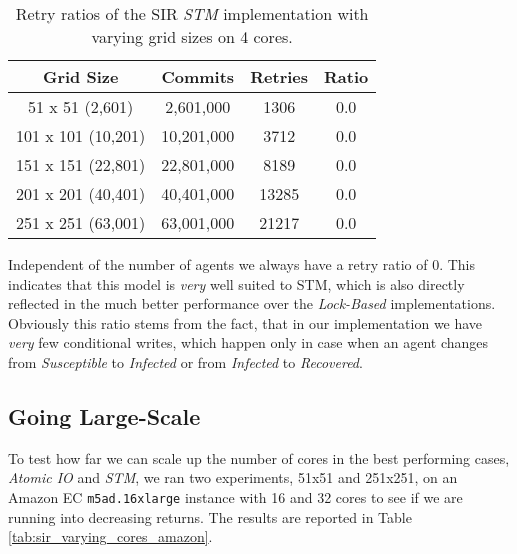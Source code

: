 \begin{table}
	\centering
  	\begin{tabular}{ c || c | c | c }
        Grid Size 		   & Commits     & Retries  & Ratio  \\ \hline \hline 
   		51 x 51 (2,601)     & 2,601,000   & 1306     & 0.0    \\ \hline
   		101 x 101 (10,201)  & 10,201,000  & 3712     & 0.0    \\ \hline
   		151 x 151 (22,801)  & 22,801,000  & 8189     & 0.0    \\ \hline
   		201 x 201 (40,401)  & 40,401,000  & 13285    & 0.0    \\ \hline
   		251 x 251 (63,001)  & 63,001,000  & 21217    & 0.0    \\ \hline \hline
  	\end{tabular}
  	
  	\caption{Retry ratios of the SIR \textit{STM} implementation with varying grid sizes on 4 cores.}
	\label{tab:retries_stm}
\end{table}

Independent of the number of agents we always have a retry ratio of 0. This indicates that this model is \textit{very} well suited to STM, which is also directly reflected in the much better performance over the \textit{Lock-Based} implementations. Obviously this ratio stems from the fact, that in our implementation we have \textit{very} few conditional writes, which happen only in case when an agent changes from \textit{Susceptible} to \textit{Infected} or from \textit{Infected} to \textit{Recovered}. 

\subsection{Going Large-Scale}
To test how far we can scale up the number of cores in the best performing cases, \textit{Atomic IO} and \textit{STM}, we ran two experiments, 51x51 and 251x251, on an Amazon EC \texttt{m5ad.16xlarge} instance with 16 and 32 cores to see if we are running into decreasing returns. The results are reported in Table \ref{tab:sir_varying_cores_amazon}.

